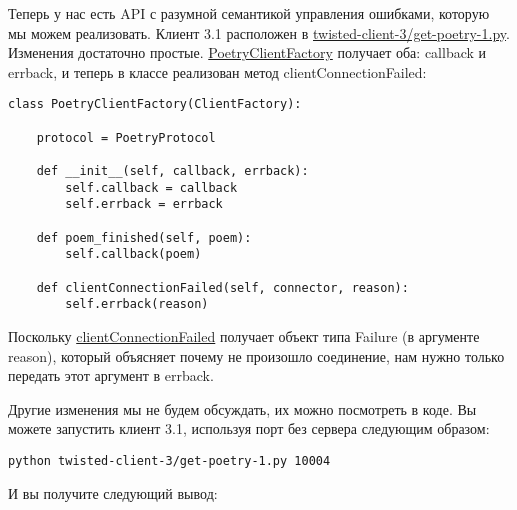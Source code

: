 
Теперь у нас есть API с разумной семантикой управления 
ошибками, которую мы можем реализовать. Клиент 3.1 расположен в
\href{http://github.com/jdavisp3/twisted-intro/blob/master/twisted-client-3/get-poetry-1.py}{twisted-client-3/get-poetry-1.py}. 
Изменения достаточно простые. 
\href{http://github.com/jdavisp3/twisted-intro/blob/master/twisted-client-3/get-poetry-1.py#L66}{PoetryClientFactory} 
получает оба: callback и errback, и теперь в классе реализован 
метод clientConnectionFailed:

 \begin{verbatim}
class PoetryClientFactory(ClientFactory):

    protocol = PoetryProtocol

    def __init__(self, callback, errback):
        self.callback = callback
        self.errback = errback

    def poem_finished(self, poem):
        self.callback(poem)

    def clientConnectionFailed(self, connector, reason):
        self.errback(reason)
\end{verbatim} 


Поскольку 
\href{http://twistedmatrix.com/trac/browser/tags/releases/twisted-8.2.0/twisted/internet/protocol.py#L118}{clientConnectionFailed} 
получает объект типа Failure (в аргументе reason), 
который объясняет почему не произошло соединение, нам нужно 
только передать этот аргумент в errback. 


Другие изменения мы не будем обсуждать, их можно посмотреть в коде. 
Вы можете запустить клиент 3.1, используя порт без сервера 
следующим образом:

 \begin{verbatim}
python twisted-client-3/get-poetry-1.py 10004
\end{verbatim} 


И вы получите следующий вывод:

